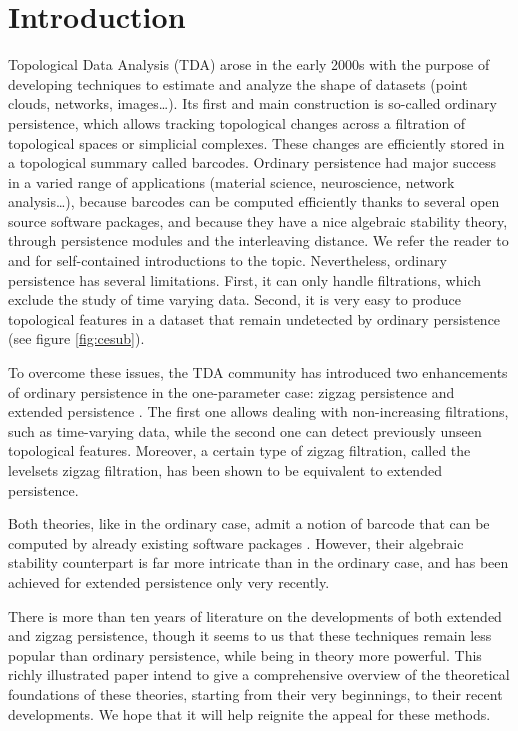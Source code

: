 \documentclass[11pt]{article}
\theoremstyle{remark}
\begin{document}
\tableofcontents
\newpage





\section{Introduction}

Topological Data Analysis (TDA) arose in the early 2000s with the purpose of developing techniques to estimate and analyze the shape of datasets (point clouds, networks, images…). Its first and main construction is so-called ordinary persistence, which allows tracking topological changes across a filtration of topological spaces or simplicial complexes. These changes are efficiently stored in a topological summary called barcodes. Ordinary persistence had major success in a varied range of applications (material science, neuroscience, network analysis…), because barcodes can be computed efficiently thanks to several open source software packages, and because they have a nice algebraic stability theory, through persistence modules and the interleaving distance. We refer the reader to \cite{oudot:hal-01247501} and \cite{dey2022computational} for self-contained introductions to the topic. Nevertheless, ordinary persistence has several limitations. First, it can only handle filtrations, which exclude the study of time varying data. Second, it is very easy to produce topological features in a dataset that remain undetected by ordinary persistence (see figure \ref{fig:cesub}).

To overcome these issues, the TDA community has introduced two enhancements of ordinary persistence in the one-parameter case: zigzag persistence \cite{carlsson2008zigzag} and extended persistence \cite{article}. The first one allows dealing with non-increasing filtrations, such as time-varying data, while the second one can detect previously unseen topological features. Moreover, a certain type of zigzag filtration, called the levelsets zigzag filtration, has been shown to be equivalent to extended persistence.

Both theories, like in the ordinary case, admit a notion of barcode that can be computed by already existing software packages \cite{gudhi:urm,Dionysus}. However, their algebraic stability counterpart is far more intricate than in the ordinary case, and has been achieved for extended persistence only very recently. 

There is more than ten years of literature on the developments of both extended and zigzag persistence, though it seems to us that these techniques remain less popular than ordinary persistence, while being in theory more powerful. This richly illustrated paper intend to give a comprehensive overview of the theoretical foundations of these theories, starting from their very beginnings, to their recent developments. We hope that it will help reignite the appeal for these methods. 
\end{document}
